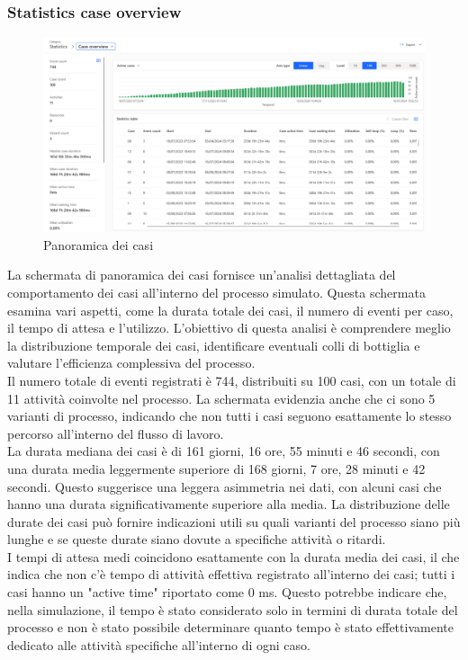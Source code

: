 \documentclass{article}
\begin{document}
\subsubsection{Statistics case overview}
\begin{figure}[H]
    \centering
    \includegraphics[width=\textwidth]{imgMicrosoft/PrimaSimulazione/StatisticsCaseOverviewSimulazione1.png}
    \caption{Panoramica dei casi}
    \label{fig:statistics-case-overview}
\end{figure}
La schermata di panoramica dei casi fornisce un'analisi dettagliata del comportamento dei casi all'interno del processo simulato. Questa schermata esamina vari aspetti, come la durata totale dei casi, il numero di eventi per caso, il tempo di attesa e l'utilizzo. L'obiettivo di questa analisi è comprendere meglio la distribuzione temporale dei casi, identificare eventuali colli di bottiglia e valutare l'efficienza complessiva del processo.\\
Il numero totale di eventi registrati è 744, distribuiti su 100 casi, con un totale di 11 attività coinvolte nel processo. La schermata evidenzia anche che ci sono 5 varianti di processo, indicando che non tutti i casi seguono esattamente lo stesso percorso all'interno del flusso di lavoro.\\
La durata mediana dei casi è di 161 giorni, 16 ore, 55 minuti e 46 secondi, con una durata media leggermente superiore di 168 giorni, 7 ore, 28 minuti e 42 secondi. Questo suggerisce una leggera asimmetria nei dati, con alcuni casi che hanno una durata significativamente superiore alla media. La distribuzione delle durate dei casi può fornire indicazioni utili su quali varianti del processo siano più lunghe e se queste durate siano dovute a specifiche attività o ritardi.\\
I tempi di attesa medi coincidono esattamente con la durata media dei casi, il che indica che non c'è tempo di attività effettiva registrato all'interno dei casi; tutti i casi hanno un "active time" riportato come 0 ms. Questo potrebbe indicare che, nella simulazione, il tempo è stato considerato solo in termini di durata totale del processo e non è stato possibile determinare quanto tempo è stato effettivamente dedicato alle attività specifiche all'interno di ogni caso.\\
\end{document}

